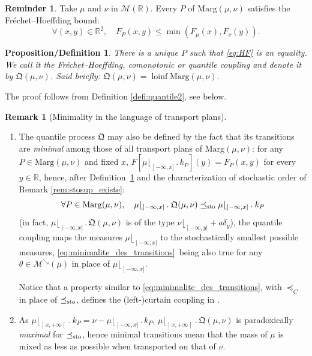 \documentclass[JEP,XML,SOM,Unicode,NoEqCountersInSection,NoFloatCountersInSection,published]{cedram}
\newcommand{\ldot}{\mathbin{.}}
\theoremstyle{plain}
\newtheorem{prodefinition}[them]{Proposition/Definition}
\theoremstyle{definition}
\newtheorem{rem}[them]{Remark}
\newtheorem{reminder}[them]{Reminder}
\newcommand{\como}{\mathfrak{Q}}
\newcommand{\m}{\mathcal{M}}
\newcommand{\ma}{\mathrm{Marg}}
\newcommand{\R}{\mathbb{R}}
\newcommand{\lcinf}{\operatorname{loinf}}
\newcommand{\leqc}{\preceq_{C}}
\newcommand{\leqs}{\preceq_{\text{\rm sto}}}
\newcommand{\mdec}{\mathcal{M}^{\scriptscriptstyle\searrow}}
\newcommand{\op}{\mathopen}
\newcommand{\clo}{\mathclose}
\begin{document}
\begin{reminder}Take $\mu$ and $\nu$ in $\m(\R)$. Every $P$ of $\ma(\mu,\nu)$ satisfies the Fréchet--Hoeffding bound:
\begin{equation}\label{eq:HF}
\forall(x,y)\in\R^2,\quad F_P(x,y)\leq \min(F_\mu(x),F_\nu(y)).
\end{equation}
\end{reminder}

\begin{prodefinition}\label{defi:quantile1}There is a unique $P$ such that \eqref{eq:HF} is an equality. We call it the Fréchet--Hoeffding, comonotonic or \emph{quantile coupling} and denote it by $\como(\mu,\nu)$. Said briefly: $\como(\mu,\nu)=\lcinf \ma(\mu,\nu)$.
\end{prodefinition}

The proof follows from Definition \ref{defi:quantile2}, see below.

\skpt
\begin{rem}[Minimality in the language of transport plans]\label{rem:q_is_mini}
\begin{enumerate}
\item
The quantile process $\como$ may also be defined by the fact that its transitions are \emph{minimal} among those of all transport plans of $\ma(\mu,\nu)$: for any $P\in\ma(\mu,\nu)$ and fixed $x$, $F[\mu\lfloor_{\op]-\infty,x]}{}\ldot k_P](y)= F_P(x,y)$ for every $y\in \R$, hence, after Definition~\ref{defi:quantile1} and the characterization of stochastic order of Remark \ref{rem:stosup_existe}:
\begin{equation}\label{eq:minimalite_des_transitions}\forall P\in\ma(\mu,\nu),\quad\mu\lfloor_{\op]-\infty,x]}{}{}\ldot\como(\mu,\nu)\leqs\mu\lfloor_{\op]-\infty,x]}{}{}\ldot k_P
\end{equation}
(in fact, $\mu\lfloor_{\op]-\infty,x]}{}{}\ldot\como(\mu,\nu)$ is of the type $\nu\lfloor_{\op]-\infty,y[}+a\delta_y$), \ie the quantile coupling maps the measures $\mu\lfloor_{\op]-\infty,x]}$ to the stochastically smallest possible measures, \eqref{eq:minimalite_des_transitions}~being also true for any $\theta\in \mdec(\mu)$ in place of $\mu\lfloor_{\op]-\infty,x]}$.

Notice that a property similar to \eqref{eq:minimalite_des_transitions}, with $\leqc$ in place of $\leqs$, defines the (left\nobreakdash-)curtain coupling in \cite{BJ}.

\item
As $\mu\lfloor_{\op]x,+\infty\clo[}{}{}\ldot k_P=\nu-\mu\lfloor_{\op]-\infty,x]}{}{}\ldot k_{P}$, $\mu\lfloor_{\op]x,+\infty\clo[}{}{}\ldot\como(\mu,\nu)$ is paradoxically \emph{maximal} for $\leqs$, hence minimal transitions mean that the mass of $\mu$ is mixed as less as possible when transported on that of $\nu$.
\end{enumerate}
\end{rem}
\end{document}

